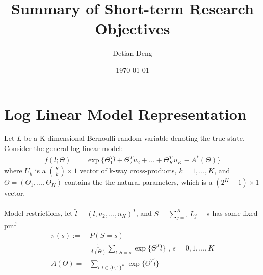 \documentclass[11 pt, a4paper]{article}  %
\begin{document}
\title{Summary of Short-term Research Objectives}   %
\author{Detian Deng}         %
\date{\today}    %
\maketitle




\section{Log Linear Model Representation}             %
Let $L$ be a K-dimensional Bernoulli random variable denoting the true state.
Consider the general log linear model:
\begin{align*}
f(l; \Theta) = & \exp \{\Theta_1^T l + \Theta_2^{T} u_2 + \ldots + \Theta_K^T u_K - A^*(\Theta)\}
\end{align*}
where $U_k$ is a ${K \choose k} \times 1$ vector of k-way cross-products, $k = 1,\ldots,K$,  and $\Theta = (\Theta_1,\ldots, \Theta_K)$ contains the the natural parameters, which is a $(2^K-1) \times 1$ vector.\\
\ \\
Model restrictions, let $\tilde{l} = (l,u_2,\dots,u_K)^T$, and $S = \sum_{j=1}^K L_j = s$ has some fixed pmf 
\begin{align}
\pi(s) := & P(S=s)\nonumber \\ 
= & \frac{1}{A(\Theta)} \sum_{\tilde{l}:S=s}\exp \{ \Theta^T \tilde{l}\}  \text{ , } s = 0,1,\ldots, K \\
A(\Theta) = & \sum_{\tilde{l}:l\in \{0,1\}^K}\exp \{ \Theta^T \tilde{l}\}
\end{align}
\end{document}
